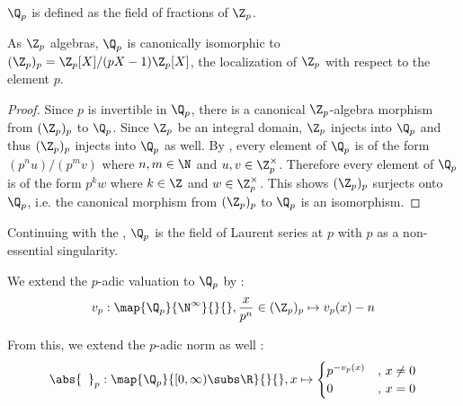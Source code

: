 \begin{dfn}
  
  $\Q_p$ is defined as the field of fractions of $\Z_p$. 
\end{dfn}

\begin{prop}[$\Q_p$ as Localizing $\Z_p$ at $p$]
  
  As $\Z_p$ algebras,
  $\Q_p$ is canonically isomorphic to $(\Z_p)_p = \Z_p[X]/(pX-1)\Z_p[X]$,
  the localization of $\Z_p$ with respect to the element $p$. 
\end{prop}
\begin{proof}
  Since $p$ is invertible in $\Q_p$, 
  there is a canonical $\Z_p$-algebra morphism from $(\Z_p)_p$ to $\Q_p$.
  Since $\Z_p$ be an integral domain, 
  $\Z_p$ injects into $\Q_p$ and thus $(\Z_p)_p$ injects into $\Q_p$ as well.
  By ,
  every element of $\Q_p$ is of the form $(p^nu)/(p^m v)$ where 
  $n, m \in \N$ and $u, v \in \Z_p^\times$. 
  Therefore every element of $\Q_p$ is of the form $p^k w$
  where $k \in \Z$ and $w \in \Z_p^\times$. 
  This shows $(\Z_p)_p$ surjects onto $\Q_p$,
  i.e. the canonical morphism from $(\Z_p)_p$ to $\Q_p$ is an isomorphism.
\end{proof}

\begin{rmk}[Meaning of $\Q_p$]
  
  Continuing with the , 
  $\Q_p$ is the field of Laurent series at $p$ 
  with $p$ as a non-essential singularity.
\end{rmk}

\begin{dfn}
  
  We extend the $p$-adic valuation to $\Q_p$ by : 
  \begin{align*}
    v_p : \map{\Q_p}{\N^\infty}{}{}, 
    \frac{x}{p^n} \in (\Z_p)_p \mapsto v_p(x) - n
  \end{align*}

  From this, we extend the $p$-adic norm as well : 
  \begin{align*}
    \abs{\hspace{5pt}}_p : \map{\Q_p}{[0,\infty)\subs \R}{}{}, 
    x \mapsto \begin{cases}
      p^{-v_p(x)} &,\, x \neq 0 \\
      0 &,\, x = 0
    \end{cases}
  \end{align*}
\end{dfn}

